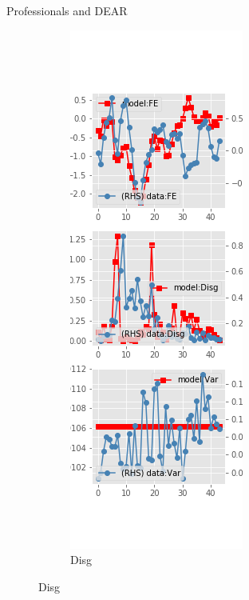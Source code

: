 \documentclass{beamer}
\begin{document}
\begin{frame}{Professionals and DEAR}
\begin{figure}[ht]
\begin{subfigure}[b]{0.2\textwidth}
		\end{subfigure}
		\hfill
		\begin{subfigure}[b]{0.2\textwidth}
			\caption{Disg}
			\includegraphics[width=\textwidth, height = 0.8\textheight]{figuresDraft/spf_de_est_diag1.png}

\end{subfigure}
\end{figure}
\end{frame}
\end{document}
